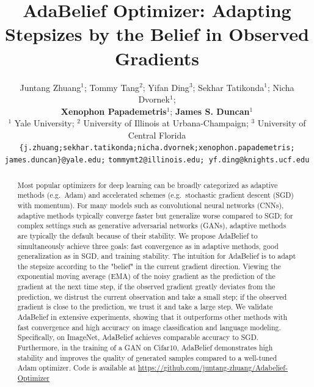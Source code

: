 \documentclass{article}
\title{AdaBelief Optimizer: Adapting Stepsizes by the Belief in Observed Gradients}
\author{%
  Juntang Zhuang$^1$; Tommy Tang$^2$; Yifan Ding$^3$; Sekhar Tatikonda$^1$; Nicha Dvornek$^1$; \\
  \textbf{Xenophon Papademetris}$^1$; \textbf{James S. Duncan}$^1$\\
  $^1$ Yale University; $^2$ University of Illinois at Urbana-Champaign; $^3$ University of Central Florida\\
  \texttt{\{j.zhuang;sekhar.tatikonda;nicha.dvornek;xenophon.papademetris;} \\ \texttt{james.duncan\}@yale.edu;}
  \texttt{tommymt2@illinois.edu; yf.ding@knights.ucf.edu}
}
\begin{document}
\maketitle

\begin{abstract}
Most popular optimizers for deep learning can be broadly categorized as adaptive methods (e.g.~Adam) and accelerated schemes (e.g.~stochastic gradient descent (SGD) with momentum).
For many models such as convolutional neural networks (CNNs), adaptive methods typically converge faster but generalize worse compared to SGD; for complex settings such as generative adversarial networks (GANs), adaptive methods are typically the default because of their stability. %
We propose AdaBelief to simultaneously achieve three goals: fast convergence as in adaptive methods, good generalization as in SGD, and training stability.
The intuition for AdaBelief is to adapt the stepsize according to the "belief" in the current gradient direction.
Viewing the exponential moving average (EMA) of the noisy gradient as the prediction of the gradient at the next time step, if the observed gradient greatly deviates from the prediction, we distrust the current observation and take a small step; if the observed gradient is close to the prediction, we trust it and take a large step.
We validate 
AdaBelief in extensive experiments, showing that it outperforms other methods with fast convergence and high accuracy on image classification and language modeling. Specifically, on ImageNet, AdaBelief achieves comparable accuracy to SGD. Furthermore, in the training of a GAN on Cifar10, AdaBelief demonstrates high stability and improves the quality of generated samples compared to a well-tuned Adam optimizer. Code is available at \url{https://github.com/juntang-zhuang/Adabelief-Optimizer}


\end{abstract}
\end{document}
